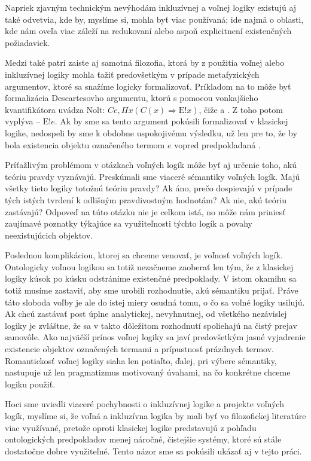 \documentclass[12pt, letterpaper]{article}
\begin{document}
Napriek zjavným technickým nevýhodám inkluzívnej a voľnej logiky existujú aj také odvetvia, kde by, myslíme si, mohla byť viac používaná; ide najmä o oblasti, kde nám oveľa viac záleží na redukovaní alebo aspoň explicitnení existenčných požiadaviek.\par
Medzi také patrí zaiste aj samotná filozofia, ktorá by z použitia voľnej alebo inkluzívnej logiky mohla ťažiť predovšetkým v prípade metafyzických argumentov, ktoré sa snažíme logicky formalizovať. Príkladom na to môže byť formalizácia Descartesovho argumentu, ktorú s pomocou vonkajšieho kvantifikátora uvádza Nolt: $Ce, \Pi x (C(x) \Rightarrow \text{E}!x)$, čiže  a . Z toho potom vyplýva  -- $\text{E}!e$. Ak by sme sa tento argument pokúsili formalizovať v klasickej logike, nedospeli by sme k obdobne uspokojivému výsledku, už len pre to, že by bola existencia objektu označeného termom $e$ vopred predpokladaná \parencites[1054]{Nolt2007}[]{sep-logic-free}.\par
Príťažlivým problémom v otázkach voľných logík môže byť aj určenie toho, akú teóriu pravdy vyznávajú. Preskúmali sme viaceré sémantiky voľných logík. Majú všetky tieto logiky totožnú teóriu pravdy? Ak áno, prečo dospievajú v prípade tých istých tvrdení k odlišným pravdivostným hodnotám? Ak nie, akú teóriu zastávajú? Odpoveď na túto otázku nie je celkom istá, no môže nám priniesť zaujímavé poznatky týkajúce sa využiteľnosti týchto logík a povahy neexistujúcich objektov.\par
Poslednou komplikáciou, ktorej sa chceme venovať, je voľnosť voľných logík. Ontologicky voľnou logikou sa totiž nezačneme zaoberať len tým, že z klasickej logiky kúsok po kúsku odstránime existenčné predpoklady. V istom okamihu sa totiž musíme zastaviť, aby sme urobili rozhodnutie, akú sémantiku prijať. Práve táto sloboda voľby je ale do istej miery osudná tomu, o čo sa voľné logiky usilujú. Ak chcú zastávať post úplne analytickej, nevyhnutnej, od všetkého nezávislej logiky je zvláštne, že sa v takto dôležitom rozhodnutí spoliehajú na čistý prejav samovôle. Ako najväčší prínos voľnej logiky sa javí predovšetkým jasné vyjadrenie existencie objektov označených termami a prípustnosť prázdnych termov. Romantickosť voľnej logiky siaha len potiaľto, ďalej, pri výbere sémantiky, nastupuje už len pragmatizmus motivovaný úvahami, na čo konkrétne chceme logiku použiť.\par

Hoci sme uviedli viaceré pochybnosti o inkluzívnej logike a projekte voľných logík, myslíme si, že voľná a inkluzívna logika by mali byť vo filozofickej literatúre viac využívané, pretože oproti klasickej logike predstavujú z pohľadu ontologických predpokladov menej náročné, čistejšie systémy, ktoré sú stále dostatočne dobre využiteľné. Tento názor sme sa pokúsili ukázať aj v tejto práci.

\pagebreak
\printbibliography
\end{document}
